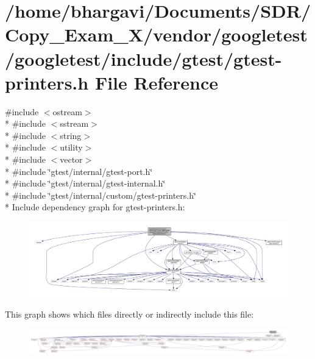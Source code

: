\hypertarget{gtest-printers_8h}{}\section{/home/bhargavi/\+Documents/\+S\+D\+R/\+Copy\+\_\+\+Exam\+\_\+X/vendor/googletest/googletest/include/gtest/gtest-\/printers.h File Reference}
\label{gtest-printers_8h}
{\ttfamily \#include $<$ostream$>$}\\*
{\ttfamily \#include $<$sstream$>$}\\*
{\ttfamily \#include $<$string$>$}\\*
{\ttfamily \#include $<$utility$>$}\\*
{\ttfamily \#include $<$vector$>$}\\*
{\ttfamily \#include \char`\"{}gtest/internal/gtest-\/port.\+h\char`\"{}}\\*
{\ttfamily \#include \char`\"{}gtest/internal/gtest-\/internal.\+h\char`\"{}}\\*
{\ttfamily \#include \char`\"{}gtest/internal/custom/gtest-\/printers.\+h\char`\"{}}\\*
Include dependency graph for gtest-\/printers.h\+:
\nopagebreak
\begin{figure}[H]
\begin{center}
\leavevmode
\includegraphics[width=350pt]{gtest-printers_8h__incl}
\end{center}
\end{figure}
This graph shows which files directly or indirectly include this file\+:
\nopagebreak
\begin{figure}[H]
\begin{center}
\leavevmode
\includegraphics[width=350pt]{gtest-printers_8h__dep__incl}
\end{center}
\end{figure}
